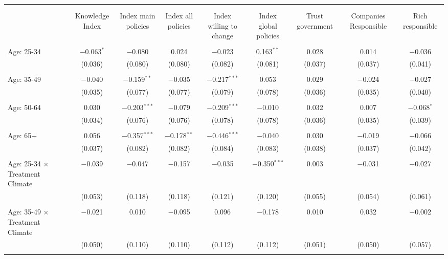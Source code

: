 
\begin{tabular}{@{\extracolsep{5pt}}lcccccccc} 
\\[-1.8ex]\hline 
\hline \\[-1.8ex] 
\\[-1.8ex] & Knowledge Index & Index main policies & Index all policies & Index willing to change & Index global policies & Trust government & Companies Responsible & Rich responsible \\ 
\hline \\[-1.8ex] 
 Age: 25-34 & $-$0.063$^{*}$ & $-$0.080 & 0.024 & $-$0.023 & 0.163$^{**}$ & 0.028 & 0.014 & $-$0.036 \\ 
  & (0.036) & (0.080) & (0.080) & (0.082) & (0.081) & (0.037) & (0.037) & (0.041) \\ 
  & & & & & & & & \\ 
 Age: 35-49 & $-$0.040 & $-$0.159$^{**}$ & $-$0.035 & $-$0.217$^{***}$ & 0.053 & 0.029 & $-$0.024 & $-$0.027 \\ 
  & (0.035) & (0.077) & (0.077) & (0.079) & (0.078) & (0.036) & (0.035) & (0.040) \\ 
  & & & & & & & & \\ 
 Age: 50-64 & 0.030 & $-$0.203$^{***}$ & $-$0.079 & $-$0.209$^{***}$ & $-$0.010 & 0.032 & 0.007 & $-$0.068$^{*}$ \\ 
  & (0.034) & (0.076) & (0.076) & (0.078) & (0.078) & (0.036) & (0.035) & (0.039) \\ 
  & & & & & & & & \\ 
 Age: 65+ & 0.056 & $-$0.357$^{***}$ & $-$0.178$^{**}$ & $-$0.446$^{***}$ & $-$0.040 & 0.030 & $-$0.019 & $-$0.066 \\ 
  & (0.037) & (0.082) & (0.082) & (0.084) & (0.083) & (0.038) & (0.037) & (0.042) \\ 
  & & & & & & & & \\
 Age: 25-34 $\times$ Treatment Climate & $-$0.039 & $-$0.047 & $-$0.157 & $-$0.035 & $-$0.350$^{***}$ & 0.003 & $-$0.031 & $-$0.027 \\ 
  & (0.053) & (0.118) & (0.118) & (0.121) & (0.120) & (0.055) & (0.054) & (0.061) \\ 
  & & & & & & & & \\ 
 Age: 35-49 $\times$ Treatment Climate & $-$0.021 & 0.010 & $-$0.095 & 0.096 & $-$0.178 & 0.010 & 0.032 & $-$0.002 \\ 
  & (0.050) & (0.110) & (0.110) & (0.112) & (0.112) & (0.051) & (0.050) & (0.057) \\ 
  & & & & & & & & \\ 

\end{tabular}
